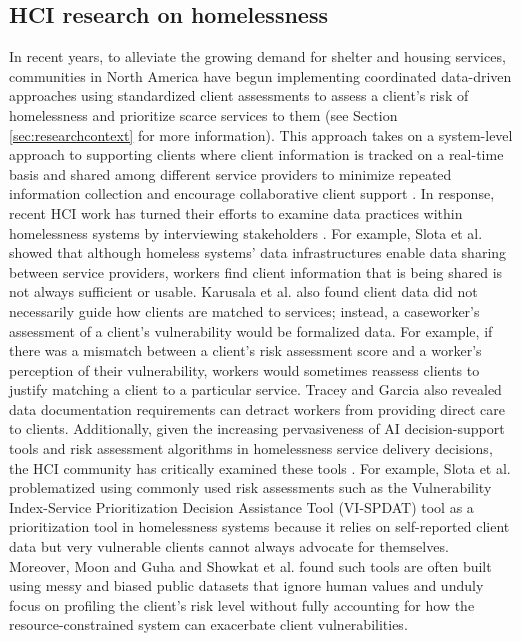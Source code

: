  

\subsection{HCI research on homelessness}

In recent years, to alleviate the growing demand for shelter and housing services, communities in North America have begun implementing coordinated data-driven approaches using standardized client assessments to assess a client's risk of homelessness and prioritize scarce services to them \cite{Ecker2022, reachinghomes, openingdoors} (see Section \ref{sec:researchcontext} for more information). This approach takes on a system-level approach to supporting clients where client information is tracked on a real-time basis and shared among different service providers to minimize repeated information collection and encourage collaborative client support \cite{Slota_2021, Ecker2022}. In response, recent HCI work has turned their efforts to examine data practices within homelessness systems by interviewing stakeholders \cite{karusala19, slota23, gondimalla24, Slota_2021, karusala_contestability24, Slota_Fleischmann_Greenberg_2022, Slota_infra2022,Slota_caring_2023}. For example, Slota et al. \cite{Slota_infra2022} showed that although homeless systems' data infrastructures enable data sharing between service providers, workers find client information that is being shared is not always sufficient or usable. Karusala et al. \cite{karusala19} also found client data did not necessarily guide how clients are matched to services; instead, a caseworker's assessment of a client's vulnerability would be formalized  data. For example, if there was a mismatch between a client's risk assessment score and a worker's perception of their vulnerability, workers would sometimes reassess clients to justify matching a client to a particular service. Tracey and Garcia \cite{Tracey_Garcia_2024_automation} also revealed data documentation requirements can detract workers from providing direct care to clients. Additionally, given the increasing pervasiveness of AI decision-support tools and risk assessment algorithms in homelessness service delivery decisions, the HCI community has critically examined these tools \cite{Tracey_Garcia_2024_automation, Slota_infra2022, Slota_caring_2023}. For example, Slota et al. \cite{slota23} problematized using commonly used risk assessments such as the Vulnerability Index-Service Prioritization Decision Assistance Tool (VI-SPDAT) tool as a prioritization tool in homelessness systems because it relies on self-reported client data but very vulnerable clients cannot always advocate for themselves. Moreover, Moon and Guha \cite{moon24} and Showkat et al. \cite{showkat23} found such tools are often built using messy and biased public datasets that ignore human values and unduly focus on profiling the client's risk level without fully accounting for how the resource-constrained system can exacerbate client vulnerabilities. 


